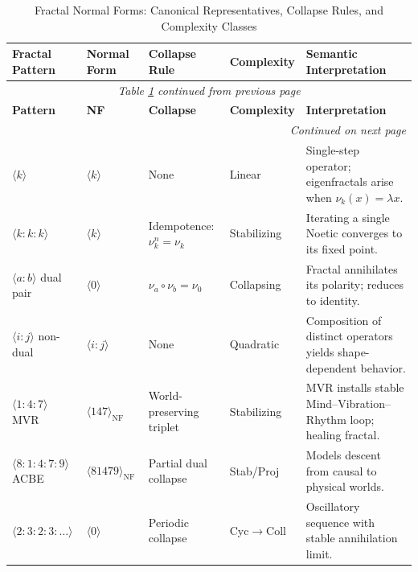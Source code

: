 \renewcommand{\arraystretch}{1.32}
\small
\begin{longtable}{p{2.8cm}|p{1.8cm}|p{2.2cm}|p{1.5cm}|p{4cm}}
\caption{Fractal Normal Forms: Canonical Representatives, Collapse Rules, and Complexity Classes}
\label{tab:fractal-normal-forms} \\
\toprule
\textbf{Fractal Pattern}
& \textbf{Normal Form}
& \textbf{Collapse Rule}
& \textbf{Complexity}
& \textbf{Semantic Interpretation}
\\
\midrule
\endfirsthead
\multicolumn{5}{c}{\textit{Table \ref{tab:fractal-normal-forms} continued from previous page}} \\
\toprule
\textbf{Pattern}
& \textbf{NF}
& \textbf{Collapse}
& \textbf{Complexity}
& \textbf{Interpretation}
\\
\midrule
\endhead
\midrule
\multicolumn{5}{r}{\textit{Continued on next page}} \\
\endfoot
\bottomrule
\endlastfoot

$\langle k \rangle$
& $\langle k \rangle$
& None
& \textsf{Linear}
& Single-step operator; eigenfractals arise when $\nu_k(x)=\lambda x$.
\\
\midrule

$\langle k:k:k\rangle$
& $\langle k \rangle$
& Idempotence: $\nu_k^n = \nu_k$
& \textsf{Stabilizing}
& Iterating a single Noetic converges to its fixed point.
\\
\midrule

$\langle a:b \rangle$ dual pair
& $\langle 0 \rangle$
& $\nu_a\circ\nu_b = \nu_0$
& \textsf{Collapsing}
& Fractal annihilates its polarity; reduces to identity.
\\
\midrule

$\langle i:j \rangle$ non-dual
& $\langle i:j \rangle$
& None
& \textsf{Quadratic}
& Composition of distinct operators yields shape-dependent behavior.
\\
\midrule

$\langle 1:4:7\rangle$ MVR
& $\langle 147 \rangle_{\mathrm{NF}}$
& World-preserving triplet
& \textsf{Stabilizing}
& MVR installs stable Mind--Vibration--Rhythm loop; healing fractal.
\\
\midrule

$\langle 8:1:4:7:9\rangle$ ACBE
& $\langle 81479 \rangle_{\mathrm{NF}}$
& Partial dual collapse
& \textsf{Stab/Proj}
& Models descent from causal to physical worlds.
\\
\midrule

$\langle 2:3:2:3:\dots \rangle$
& $\langle 0 \rangle$
& Periodic collapse
& \textsf{Cyc$\to$Coll}
& Oscillatory sequence with stable annihilation limit.
\\
\midrule


\end{longtable}
